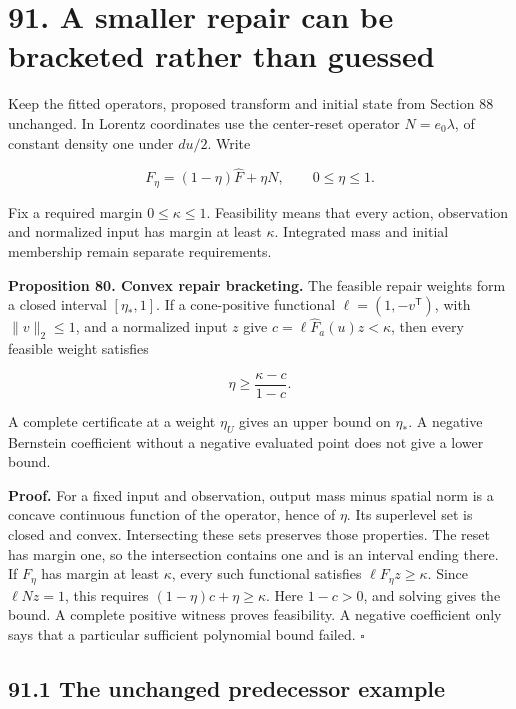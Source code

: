 \documentclass[11pt,letterpaper]{article}
\begin{document}
\section{91. A smaller repair can be bracketed rather than
guessed}\label{a-smaller-repair-can-be-bracketed-rather-than-guessed}

Keep the fitted operators, proposed transform and initial state from
Section 88 unchanged. In Lorentz coordinates use the center-reset
operator \(N=e_0\lambda\), of constant density one under \(du/2\). Write

\[
F_\eta=(1-\eta)\widehat F+\eta N,
\qquad 0\leq\eta\leq1.
\]

Fix a required margin \(0\leq\kappa\leq1\). Feasibility means that every
action, observation and normalized input has margin at least \(\kappa\).
Integrated mass and initial membership remain separate requirements.

\textbf{Proposition 80. Convex repair bracketing.} The feasible repair
weights form a closed interval \([\eta_*,1]\). If a cone-positive
functional \(\ell=(1,-v^{\mathsf T})\), with \(\|v\|_2\leq1\), and a
normalized input \(z\) give \(c=\ell\widehat F_a(u)z<\kappa\), then
every feasible weight satisfies

\[
\boxed{\eta\geq\frac{\kappa-c}{1-c}.}
\]

A complete certificate at a weight \(\eta_U\) gives an upper bound on
\(\eta_*\). A negative Bernstein coefficient without a negative
evaluated point does not give a lower bound.

\textbf{Proof.} For a fixed input and observation, output mass minus
spatial norm is a concave continuous function of the operator, hence of
\(\eta\). Its superlevel set is closed and convex. Intersecting these
sets preserves those properties. The reset has margin one, so the
intersection contains one and is an interval ending there. If \(F_\eta\)
has margin at least \(\kappa\), every such functional satisfies
\(\ell F_\eta z\geq\kappa\). Since \(\ell Nz=1\), this requires
\((1-\eta)c+\eta\geq\kappa\). Here \(1-c>0\), and solving gives the
bound. A complete positive witness proves feasibility. A negative
coefficient only says that a particular sufficient polynomial bound
failed. \(\square\)

\subsection{91.1 The unchanged predecessor
example}\label{the-unchanged-predecessor-example}
\end{document}
